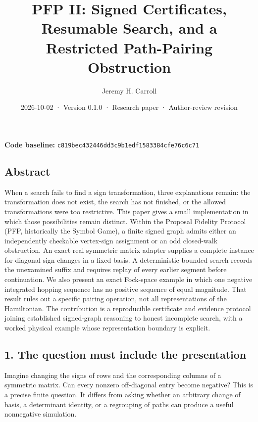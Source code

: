 \documentclass[
  11pt,
]{article}
\title{PFP II: Signed Certificates, Resumable Search, and a Restricted
Path-Pairing Obstruction}
\author{Jeremy H. Carroll}
\date{2026-10-02 · Version 0.1.0 · Research paper · Author-review
revision}
\begin{document}
\makeatletter
\begin{center}
{\LARGE \@title\par}
\vspace{0.8em}
{\normalsize \@author\par}
\vspace{0.5em}
{\small \@date\par}
\end{center}
\makeatother

\textbf{Code baseline:}
\nolinkurl{c819bec432446dd3c9b1edf1583384cfe76c6c71}

\subsection{Abstract}\label{abstract}

When a search fails to find a sign transformation, three explanations
remain: the transformation does not exist, the search has not finished,
or the allowed transformations were too restrictive. This paper gives a
small implementation in which those possibilities remain distinct.
Within the Proposal Fidelity Protocol (PFP, historically the Symbol
Game), a finite signed graph admits either an independently checkable
vertex-sign assignment or an odd closed-walk obstruction. An exact real
symmetric matrix adapter supplies a complete instance for diagonal sign
changes in a fixed basis. A deterministic bounded search records the
unexamined suffix and requires replay of every earlier segment before
continuation. We also present an exact Fock-space example in which one
negative integrated hopping sequence has no positive sequence of equal
magnitude. That result rules out a specific pairing operation, not all
representations of the Hamiltonian. The contribution is a reproducible
certificate and evidence protocol joining established signed-graph
reasoning to honest incomplete search, with a worked physical example
whose representation boundary is explicit.

\subsection{1. The question must include the
presentation}\label{the-question-must-include-the-presentation}

Imagine changing the signs of rows and the corresponding columns of a
symmetric matrix. Can every nonzero off-diagonal entry become negative?
This is a precise finite question. It differs from asking whether an
arbitrary change of basis, a determinant identity, or a regrouping of
paths can produce a useful nonnegative simulation.
\end{document}
